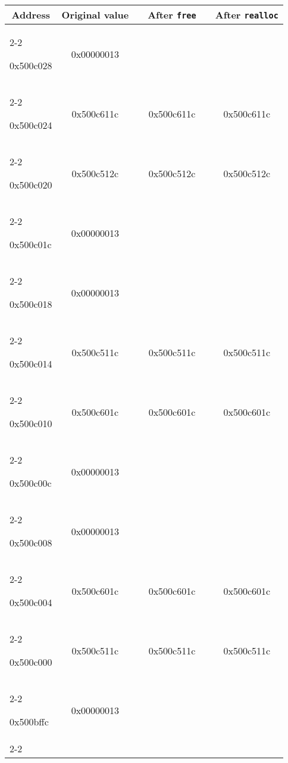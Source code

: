 \begin{question}
\newcommand{\tablineg}[4]{
  \\[0.15cm] \cline{2-2}\cline{4-4}\cline{6-6}\rule{0pt}{4ex}
  #1 & #2 && #3 && #4
  \rule{0pt}{4ex}
  }
\newcommand{\tablinea}[4]{
  \\[0.15cm] \cline{2-2}\cline{4-4}\cline{6-6}\rule{0pt}{4ex}
  #1 & #2 && {\color{blue}#3} && {\color{blue}#4}
  \rule{0pt}{4ex}
  }

\begin{tabular}{l|c|p{1cm}|c|p{1cm}|c|}
  \multicolumn{1}{c}{\textbf{Address}}
  & \multicolumn{1}{c}{\textbf{Original value}}
  & \multicolumn{1}{c}{}
  & \multicolumn{1}{c}{\textbf{After \lstinline{free}}}
  & \multicolumn{1}{c}{}
  & \multicolumn{1}{c}{\textbf{After \lstinline{realloc}}}

    \tablinea{0x500c028}{0x00000013}{          }{          }
    \tablineg{0x500c024}{0x500c611c}{0x500c611c}{0x500c611c}
    \tablineg{0x500c020}{0x500c512c}{0x500c512c}{0x500c512c}
    \tablinea{0x500c01c}{0x00000013}{          }{          }
    \tablinea{0x500c018}{0x00000013}{          }{          }
    \tablineg{0x500c014}{0x500c511c}{0x500c511c}{0x500c511c}
    \tablineg{0x500c010}{0x500c601c}{0x500c601c}{0x500c601c}
    \tablinea{0x500c00c}{0x00000013}{          }{          }
    \tablinea{0x500c008}{0x00000013}{          }{          }
    \tablineg{0x500c004}{0x500c601c}{0x500c601c}{0x500c601c}
    \tablineg{0x500c000}{0x500c511c}{0x500c511c}{0x500c511c}
    \tablinea{0x500bffc}{0x00000013}{          }{          }

  \\[0.15cm] \cline{2-2}\cline{4-4}\cline{6-6}
\end{tabular}

~



\end{question}

\newpage

\begin{question}

\end{question}

